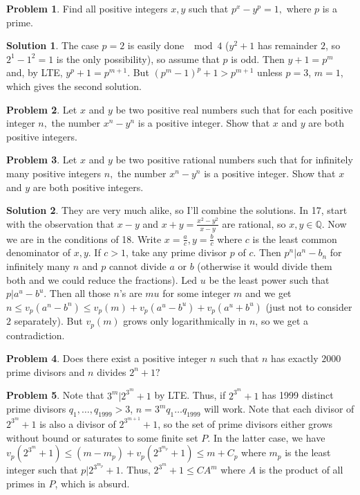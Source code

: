 \documentclass{article}
\theoremstyle{definition}
\newtheorem{problem}{Problem}
\newtheorem*{solution}{Solution}
\begin{document}
\begin{problem}
Find all positive integers $x,y$ such that $p^x - y^p=1,$ where $p$ is a prime.
\end{problem}


\begin{solution}
The case $p=2$ is easily done $\mod 4$ ($y^2+1$ has remainder $2$, so $2^1-1^2=1$ is the only possibility), so assume that $p$ is odd. Then $y+1=p^m$ and, by LTE, $y^p+1=p^{m+1}$. But $(p^m-1)^p+1>p^{m+1}$ unless $p=3$, $m=1$, which gives the second solution.
\end{solution}


\begin{problem}
Let $x$ and $y$ be two positive real numbers such that for each positive integer $n,$ the number $x^n-y^n$ is a positive integer. Show that $x$ and $y$ are both positive integers.
\end{problem}

\begin{problem}
Let $x$ and $y$ be two positive rational numbers such that for infinitely many positive integers $n,$ the number $x^n-y^n$ is a positive integer. Show that $x$ and $y$ are both positive integers.
\end{problem}

\begin{solution}
They are very much alike, so I'll combine the solutions.
In 17, start with the observation that $x-y$ and $x+y=\frac{x^2-y^2}{x-y}$ are rational, so $x,y\in\mathbb Q$.
Now we are in the conditions of 18. Write $x=\frac ac,y=\frac bc$ where $c$ is the least common denominator of $x,y$. If $c>1$, take any prime divisor $p$ of $c$. Then $p^n|a^n-b_n$ for infinitely many $n$ and $p$ cannot divide $a$ or $b$ (otherwise it would divide them both and we could reduce the fractions). Led $u$ be the least power such that $p|a^u-b^u$. Then all those $n$'s are $mu$ for some integer $m$ and we get $n\le v_p(a^n-b^n)\le v_p(m)+v_p(a^u-b^u)+v_p(a^u+b^u)$ (just not to consider $2$ separately). But $v_p(m)$ grows only logarithmically in $n$, so we get a contradiction.
\end{solution}

\begin{problem}
Does there exist a positive integer $n$ such that $n$ has exactly $2000$ prime divisors and $n$ divides $2^n + 1?$
\end{problem}

\begin{problem}
Note that $3^m|2^{3^m}+1$ by LTE. Thus, if $2^{3^m}+1$ has 1999 distinct prime divisors $q_1,\dots, q_{1999}>3$, $n=3^mq_1\dots q_{1999}$ will work. Note that each divisor of $2^{3^m}+1$ is also a divisor of $2^{3^{m+1}}+1$, so the set of prime divisors either grows without bound or saturates to some finite set $P$. In the latter case, we have $v_p(2^{3^m}+1)\le (m-m_p)+v_p(2^{3^{m_p}}+1)\le m+C_p$ where $m_p$ is the least integer such that $p|2^{3^{m_p}}+1$. Thus, $2^{3^m}+1\le CA^m$ where $A$ is the product of all primes in $P$, which is absurd.
\end{problem}
\end{document}
